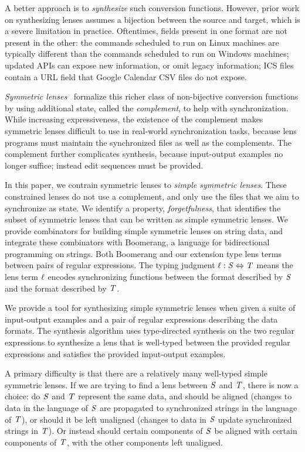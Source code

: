 \documentclass[acmsmall,screen,anonymous]{acmart}
\begin{document}
A better approach is to \emph{synthesize} such conversion functions. However,
prior work on synthesizing lenses assumes a bijection between the source and
target, which is a severe limitation in practice. Oftentimes, fields present in
one format are not present in the other: the commands scheduled to run on Linux
machines are typically different than the commands scheduled to run on Windows
machines; updated APIs can expose new information, or omit legacy information;
ICS files contain a URL field that Google Calendar CSV files do not expose.

\emph{Symmetric lenses}~\cite{symmetric-lenses} formalize this richer class of
non-bijective conversion functions by using additional state, called the
\emph{complement}, to help with synchronization. While increasing
expressiveness, the existence of the complement makes symmetric lenses difficult
to use in real-world synchronization tasks, because lens programs must maintain
the synchronized files as well as the complements. The complement further
complicates synthesis, because input-output examples no longer suffice; instead
edit sequences must be provided.

In this paper, we contrain symmetric lenses to \emph{simple symmetric lenses}.
These constrained lenses do not use a complement, and only use the files that we
aim to synchronize as state. We identify a property, \emph{forgetfulness}, that
identifies the subset of symmetric lenses that can be written as simple
symmetric lenses. We provide combinators for building simple symmetric lenses on
string data, and integrate these combinators with Boomerang, a language for
bidirectional programming on strings. Both Boomerang and our extension type lens
terms between pairs of regular expressions. The typing judgment $\mathit{\ell} : \mathit{S}
\Leftrightarrow \mathit{T}$ means the lens term $\mathit{\ell}$ encodes synchronizing
functions between the format described by $\mathit{S}$ and the format described by
$\mathit{T}$.

We provide a tool for synthesizing simple symmetric lenses when given a suite of
input-output examples and a pair of regular expressions describing the data
formats. The synthesis algorithm uses type-directed synthesis
on the two regular expressions to synthesize a lens that is well-typed between
the provided regular expressions and satisfies the provided input-output
examples.

 A primary difficulty is
that there are a relatively many well-typed simple symmetric lenses. If we are
trying to find a lens between $\mathit{S}$ and $\mathit{T}$, there is now a choice:
do $\mathit{S}$ and $\mathit{T}$ represent the same data, and should be aligned
(changes to data in the language of $\mathit{S}$ are propagated to synchronized
strings in the language of $\mathit{T}$), or should it be left unaligned (changes
to data in $\mathit{S}$ update synchronized strings in $\mathit{T}$). Or instead
should certain components of $\mathit{S}$ be aligned with certain components of
$\mathit{T}$, with the other components left unaligned.
\end{document}
